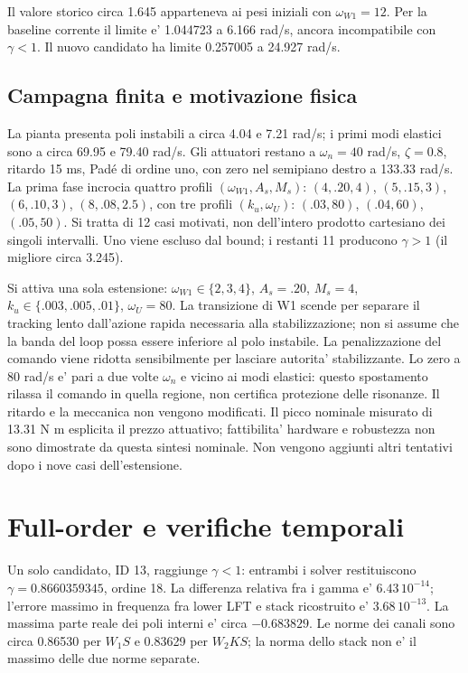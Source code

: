 Il valore storico circa 1.645 apparteneva ai pesi iniziali con
$\omega_{W1}=12$. Per la baseline corrente il limite e' 1.044723
a 6.166 rad/s, ancora incompatibile con $\gamma<1$.
Il nuovo candidato ha limite 0.257005 a 24.927 rad/s.

\subsection{Campagna finita e motivazione fisica}
La pianta presenta poli instabili a circa 4.04 e 7.21 rad/s; i primi
modi elastici sono a circa 69.95 e 79.40 rad/s. Gli attuatori restano
a $\omega_n=40$ rad/s, $\zeta=0.8$, ritardo 15 ms, Pad\'e di ordine uno,
con zero nel semipiano destro a 133.33 rad/s.
La prima fase incrocia quattro profili $(\omega_{W1},A_s,M_s)$:
$(4,.20,4)$, $(5,.15,3)$, $(6,.10,3)$, $(8,.08,2.5)$, con tre
profili $(k_u,\omega_U)$: $(.03,80)$, $(.04,60)$, $(.05,50)$.
Si tratta di 12 casi motivati, non dell'intero prodotto cartesiano
dei singoli intervalli. Uno viene escluso dal bound; i restanti 11
producono $\gamma>1$ (il migliore circa 3.245).

Si attiva una sola estensione: $\omega_{W1}\in\{2,3,4\}$,
$A_s=.20$, $M_s=4$, $k_u\in\{.003,.005,.01\}$, $\omega_U=80$.
La transizione di W1 scende per separare il tracking lento dall'azione
rapida necessaria alla stabilizzazione; non si assume che la banda
del loop possa essere inferiore al polo instabile.
La penalizzazione del comando viene ridotta sensibilmente per lasciare
autorita' stabilizzante. Lo zero a 80 rad/s e' pari a due volte
$\omega_n$ e vicino ai modi elastici: questo spostamento rilassa
il comando in quella regione, non certifica protezione delle risonanze.
Il ritardo e la meccanica non vengono modificati. Il picco nominale
misurato di 13.31 N m esplicita il prezzo attuativo; fattibilita' hardware
e robustezza non sono dimostrate da questa sintesi nominale.
Non vengono aggiunti altri tentativi dopo i nove casi dell'estensione.


\section{Full-order e verifiche temporali}
Un solo candidato, ID 13, raggiunge $\gamma<1$: entrambi i solver
restituiscono $\gamma=0.8660359345$, ordine 18. La differenza relativa
fra i gamma e' $6.43\,10^{-14}$; l'errore massimo in frequenza fra
lower LFT e stack ricostruito e' $3.68\,10^{-13}$.
La massima parte reale dei poli interni e' circa $-0.683829$.
Le norme dei canali sono circa 0.86530 per $W_1S$ e 0.83629 per $W_2KS$;
la norma dello stack non e' il massimo delle due norme separate.

